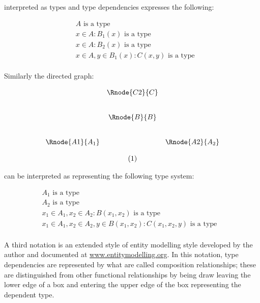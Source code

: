 \documentclass[12pt,a4paper]{article}
\begin{document}
\noindent interpreted as types and type dependencies expresses the following:
\addtocounter{equation}{-1}
\begin{subequations}
\begin{align}
&A\mbox{ is a type} \\
&x\in A : B_1(x) \mbox{ is a type} \\
&x\in A : B_2(x) \mbox{ is a type} \\
&x\in A, y\in B_1(x): C(x,y) \mbox{ is a type}
\end{align}
\end{subequations}
\\

\noindent Similarly the directed graph:

\begin{center}
$
\begin{array}{p{1.5cm}cccp{2cm}c}
&                & \Rnode{C2}{C}&   \\ [0.8cm]
&                & \Rnode{B}{B} &  \\ [0.8cm]
&\Rnode{A1}{A_1} &              & \Rnode{A2}{A_2}\\ [0.4cm]
&                &\stepcounter{equation}(\theequation) &  \\
\end{array}
$
\setlength {\saroffsetA}{-2pt}
\setlength {\saroffsetB}{-2pt}
\setlength {\saroffsetA}{2pt}
\setlength {\saroffsetB}{2pt}
\sarreset
{}
\end{center}

\noindent can be interpreted as representing the following type system:

\addtocounter{equation}{-1}
\begin{align}
&A_1\mbox{ is a type} && \tag*{(\theequation a)}\\
&A_2\mbox{ is a type} && \tag*{(\theequation b)}\\
&x_1\in A_1, x_2 \in A_2 : B(x_1,x_2) \mbox{ is a type} && \tag*{(\theequation c)}\\
&x_1\in A_1, x_2 \in A_2, y \in B(x_1,x_2): C(x_1,x_2,y) \mbox{ is a type} && \tag*{(\theequation d)}\\
\end{align}

\noindent 
A third notation is an extended style of entity modelling style developed by the author and documented at \href{www.entitymodelling.org}{www.entitymodelling.org}. In this notation, type dependencies are represented by what are called composition relationships; these are distinguished from other functional relationships by being draw leaving the
lower edge of a box and entering the upper edge of the box representing the dependent type. \\
\end{document}
